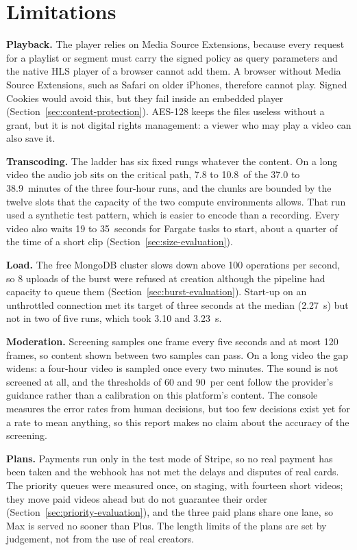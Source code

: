 \section{Limitations}
\label{sec:limitations}

\textbf{Playback.} The player relies on Media Source Extensions, because every request for a
playlist or segment must carry the signed policy as query parameters and the native HLS player of a
browser cannot add them. A browser without Media Source Extensions, such as Safari on older iPhones,
therefore cannot play. Signed Cookies would avoid this, but they fail inside an embedded player
(Section~\ref{sec:content-protection}). AES-128 keeps the files useless without a grant, but it is
not digital rights management: a viewer who may play a video can also save it.

\textbf{Transcoding.} The ladder has six fixed rungs whatever the content. On a long video the audio
job sits on the critical path, 7.8 to 10.8~of the 37.0 to 38.9~minutes of the three four-hour runs, and the chunks are
bounded by the twelve slots that the capacity of the two compute environments allows. That run used a
synthetic test pattern, which is easier to encode than a recording. Every video also waits
19 to 35~seconds for Fargate tasks to start, about a quarter of the time of a short clip
(Section~\ref{sec:size-evaluation}).

\textbf{Load.} The free MongoDB cluster slows down above 100 operations per second, so 8 uploads of the
burst were refused at creation although the pipeline had capacity to queue them
(Section~\ref{sec:burst-evaluation}). Start-up on an unthrottled connection met its target of three seconds at the median (2.27~s) but not
in two of five runs, which took 3.10 and 3.23~s.

\textbf{Moderation.} Screening samples one frame every five seconds and at most 120 frames, so
content shown between two samples can pass. On a long video the gap widens: a four-hour video is
sampled once every two minutes. The sound is not screened at all, and the thresholds of 60 and 90~per cent follow the provider's guidance rather than a
calibration on this platform's content. The console measures the error rates from human decisions,
but too few decisions exist yet for a rate to mean anything, so this report makes no claim about the
accuracy of the screening.

\textbf{Plans.} Payments run only in the test mode of Stripe, so no real payment has been taken and
the webhook has not met the delays and disputes of real cards. The priority queues were measured once,
on staging, with fourteen short videos; they move paid videos ahead but do not guarantee their order
(Section~\ref{sec:priority-evaluation}), and the three paid plans share one lane, so Max is served no
sooner than Plus. The length limits of the plans are set by judgement, not from the use of real
creators.

